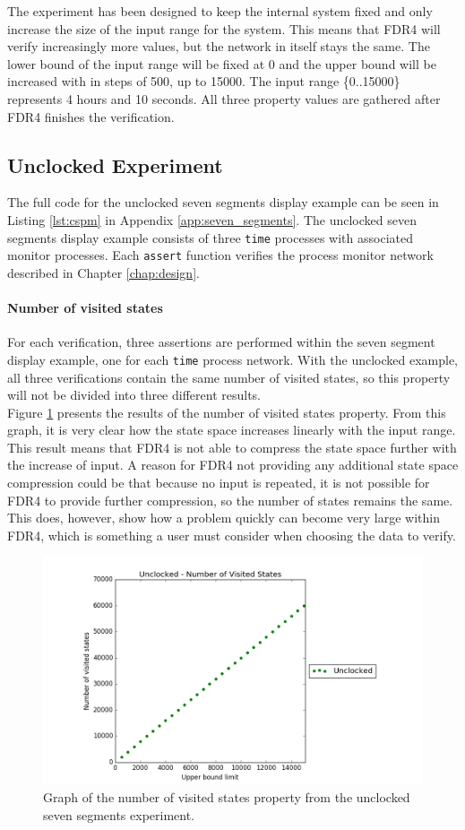 The experiment has been designed to keep the internal system fixed and only increase the size of the input range for the system. This means that FDR4 will verify increasingly more values, but the network in itself stays the same.
The lower bound of the input range will be fixed at 0 and the upper bound will be increased with in steps of 500, up to 15000. The input range \{0..15000\} represents 4 hours and 10 seconds. All three property values are gathered after FDR4 finishes the verification.
\subsection{Unclocked Experiment}
The full code for the unclocked seven segments display example can be seen in Listing \ref{lst:cspm} in Appendix \ref{app:seven_segments}.
The unclocked seven segments display example consists of three \texttt{time} processes with associated monitor processes. Each \texttt{assert} function verifies the process monitor network described in Chapter \ref{chap:design}.
\paragraph{Number of visited states}
For each verification, three assertions are performed within the seven segment display example, one for each \texttt{time} process network. With the unclocked example, all three verifications contain the same number of visited states, so this property will not be divided into three different results.\\

Figure \ref{fig:unclocked_states} presents the results of the number of visited states property. From this graph, it is very clear how the state space increases linearly with the input range. This result means that FDR4 is not able to compress the state space further with the increase of input. A reason for FDR4 not providing any additional state space compression could be that because no input is repeated, it is not possible for FDR4 to provide further compression, so the number of states remains the same. This does, however, show how a problem quickly can become very large within FDR4, which is something a user must consider when choosing the data to verify.
\begin{figure}
    \centering
    \includegraphics[scale=0.6]{./figures/plots/unclocked_states.png}
\caption{Graph of the number of visited states property from the unclocked seven segments experiment.}
\label{fig:unclocked_states}
\end{figure}

